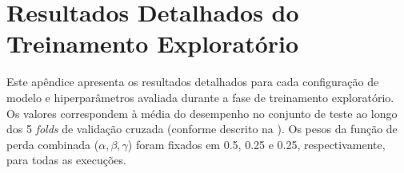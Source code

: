 \chapter{Resultados Detalhados do Treinamento Exploratório}\label{ap:resultados_exploratorios_detalhados_rev} %

Este apêndice apresenta os resultados detalhados para cada configuração de modelo e hiperparâmetros avaliada durante a fase de treinamento exploratório. Os valores correspondem à média do desempenho no conjunto de teste ao longo dos 5 \textit{folds} de validação cruzada (conforme descrito na ). Os pesos da função de perda combinada ($\alpha, \beta, \gamma$) foram fixados em 0.5, 0.25 e 0.25, respectivamente, para todas as execuções.

\begin{landscape} %
\begin{table}[!htp]
\centering
\caption[Resultados detalhados do treinamento exploratório por modelo e configuração.]{Métricas de avaliação e hiperparâmetros para os diferentes modelos testados na fase exploratória. LR: Taxa de Aprendizado; Freeze Epo: Número de épocas com \textit{encoder} congelado (0 indica que não houve congelamento); Weight D: Decaimento de Peso. Células destacadas indicam valores notáveis ou melhores para a respectiva métrica na configuração específica.}
\label{tab:ap_resultados_exploratorios_completos_rev} %
\end{table}
\end{landscape}
